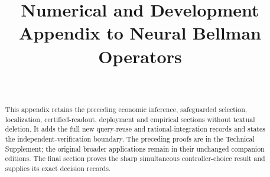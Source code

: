 \documentclass[ecta,nameyear,draft]{econsocart}
\begin{document}
\begin{frontmatter}
\title{Numerical and Development Appendix to Neural Bellman Operators}
\begin{aug}
\author[id=au1,addressref={add1}]{~}
\address[id=add1]{Peking University}
\end{aug}
\begin{abstract}
This appendix retains the preceding economic inference, safeguarded selection, localization, certified-readout, deployment and empirical sections without textual deletion. It adds the full new query-reuse and rational-integration records and states the independent-verification boundary. The preceding proofs are in the Technical Supplement; the original broader applications remain in their unchanged companion editions. The final section proves the sharp simultaneous controller-choice result and supplies its exact decision records.
\end{abstract}
\end{frontmatter}
\appendix
















\end{document}

